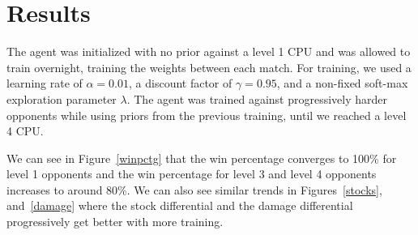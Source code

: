 \section{Results}
The agent was initialized with no prior against a level 1 CPU and was allowed to train overnight, training the weights between each match. For training, we used a learning rate of $\alpha = 0.01$, a discount factor of $\gamma = 0.95$, and a non-fixed soft-max exploration parameter $\lambda$. The agent was trained against progressively harder opponents while using priors from the previous training, until we reached a level 4 CPU. 

We can see in Figure~\ref{winpctg} that the win percentage converges to 100\% for level 1 opponents and the win percentage for level 3 and level 4 opponents increases to around 80\%. We can also see similar trends in Figures~\ref{stocks}, and~\ref{damage} where the stock differential and the damage differential progressively get better with more training.



